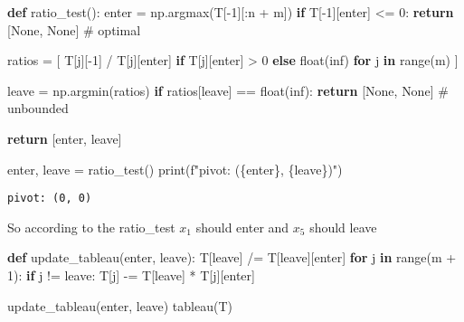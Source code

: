 \documentclass[
  letterpaper,
  DIV=11,
  numbers=noendperiod]{scrartcl}
\newenvironment{Shaded}{\begin{snugshade}}{\end{snugshade}}
\newcommand{\BuiltInTok}[1]{\textcolor[rgb]{0.00,0.23,0.31}{#1}}
\newcommand{\CommentTok}[1]{\textcolor[rgb]{0.37,0.37,0.37}{#1}}
\newcommand{\ControlFlowTok}[1]{\textcolor[rgb]{0.00,0.23,0.31}{\textbf{#1}}}
\newcommand{\DecValTok}[1]{\textcolor[rgb]{0.68,0.00,0.00}{#1}}
\newcommand{\KeywordTok}[1]{\textcolor[rgb]{0.00,0.23,0.31}{\textbf{#1}}}
\newcommand{\NormalTok}[1]{\textcolor[rgb]{0.00,0.23,0.31}{#1}}
\newcommand{\OperatorTok}[1]{\textcolor[rgb]{0.37,0.37,0.37}{#1}}
\newcommand{\SpecialCharTok}[1]{\textcolor[rgb]{0.37,0.37,0.37}{#1}}
\newcommand{\SpecialStringTok}[1]{\textcolor[rgb]{0.13,0.47,0.30}{#1}}
\newcommand{\StringTok}[1]{\textcolor[rgb]{0.13,0.47,0.30}{#1}}
\newcommand{\VariableTok}[1]{\textcolor[rgb]{0.07,0.07,0.07}{#1}}
\begin{document}
\begin{Shaded}
\begin{Highlighting}[]
\KeywordTok{def}\NormalTok{ ratio\_test():}
\NormalTok{    enter }\OperatorTok{=}\NormalTok{ np.argmax(T[}\OperatorTok{{-}}\DecValTok{1}\NormalTok{][:n }\OperatorTok{+}\NormalTok{ m])}
    \ControlFlowTok{if}\NormalTok{ T[}\OperatorTok{{-}}\DecValTok{1}\NormalTok{][enter] }\OperatorTok{\textless{}=} \DecValTok{0}\NormalTok{:}
        \ControlFlowTok{return}\NormalTok{ [}\VariableTok{None}\NormalTok{, }\VariableTok{None}\NormalTok{] }\CommentTok{\# optimal}

\NormalTok{    ratios }\OperatorTok{=}\NormalTok{ [}
\NormalTok{        T[j][}\OperatorTok{{-}}\DecValTok{1}\NormalTok{] }\OperatorTok{/}\NormalTok{ T[j][enter]}
        \ControlFlowTok{if}\NormalTok{ T[j][enter] }\OperatorTok{\textgreater{}} \DecValTok{0}
        \ControlFlowTok{else} \BuiltInTok{float}\NormalTok{(}\StringTok{\textquotesingle{}inf\textquotesingle{}}\NormalTok{)}
        \ControlFlowTok{for}\NormalTok{ j }\KeywordTok{in} \BuiltInTok{range}\NormalTok{(m)}
\NormalTok{    ]}

\NormalTok{    leave }\OperatorTok{=}\NormalTok{ np.argmin(ratios)}
    \ControlFlowTok{if}\NormalTok{ ratios[leave] }\OperatorTok{==} \BuiltInTok{float}\NormalTok{(}\StringTok{\textquotesingle{}inf\textquotesingle{}}\NormalTok{):}
        \ControlFlowTok{return}\NormalTok{ [}\VariableTok{None}\NormalTok{, }\VariableTok{None}\NormalTok{] }\CommentTok{\# unbounded}

    \ControlFlowTok{return}\NormalTok{ [enter, leave]}

\NormalTok{enter, leave }\OperatorTok{=}\NormalTok{ ratio\_test()}
\BuiltInTok{print}\NormalTok{(}\SpecialStringTok{f"pivot: (}\SpecialCharTok{\{}\NormalTok{enter}\SpecialCharTok{\}}\SpecialStringTok{, }\SpecialCharTok{\{}\NormalTok{leave}\SpecialCharTok{\}}\SpecialStringTok{)"}\NormalTok{)}
\end{Highlighting}
\end{Shaded}

\begin{verbatim}
pivot: (0, 0)
\end{verbatim}

So according to the ratio\_test \(x_1\) should enter and \(x_5\) should
leave

\begin{Shaded}
\begin{Highlighting}[]
\KeywordTok{def}\NormalTok{ update\_tableau(enter, leave):}
\NormalTok{    T[leave] }\OperatorTok{/=}\NormalTok{ T[leave][enter]}
    \ControlFlowTok{for}\NormalTok{ j }\KeywordTok{in} \BuiltInTok{range}\NormalTok{(m }\OperatorTok{+} \DecValTok{1}\NormalTok{):}
        \ControlFlowTok{if}\NormalTok{ j }\OperatorTok{!=}\NormalTok{ leave:}
\NormalTok{            T[j] }\OperatorTok{{-}=}\NormalTok{ T[leave] }\OperatorTok{*}\NormalTok{ T[j][enter]}

\NormalTok{update\_tableau(enter, leave)}
\NormalTok{tableau(T)}
\end{Highlighting}
\end{Shaded}
\end{document}
